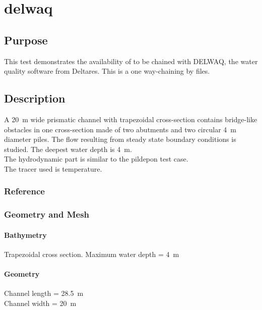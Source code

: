 \chapter{delwaq}
%
%
\section{Purpose}
%
This test demonstrates the availability of  to be chained
with DELWAQ, the water quality software from Deltares.
This is a one way-chaining by files.
%
\section{Description}
%
A 20~m wide prismatic channel with trapezoidal cross-section contains
bridge-like obstacles in one cross-section made of two abutments and two
circular 4~m diameter piles.
The flow resulting from steady state boundary conditions is studied.
The deepest water depth is 4~m.\\
The hydrodynamic part is similar to the pildepon test case.\\
The tracer used is temperature.
%
%
%
%
\subsection{Reference}
%

%
%
%
\subsection{Geometry and Mesh}
%
\subsubsection{Bathymetry}
%
Trapezoidal cross section. Maximum water depth = 4~m
%
\subsubsection{Geometry}
%
Channel length = 28.5~m\\
Channel width = 20~m
%
